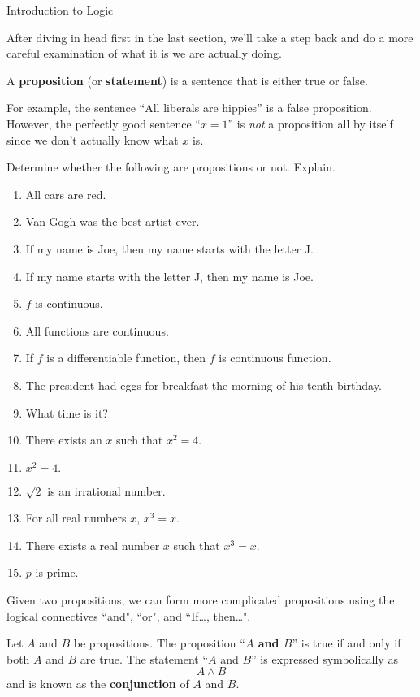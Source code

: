 \begin{section}{Introduction to Logic}

After diving in head first in the last section, we'll take a step back and do a more careful examination of what it is we are actually doing.

\begin{definition}
A \textbf{proposition} (or \textbf{statement}) is a sentence that is either true or false.
\end{definition}

For example, the sentence ``All liberals are hippies'' is a false proposition.  However, the perfectly good sentence ``$x=1$'' is \emph{not} a proposition all by itself since we don't actually know what $x$ is.

\begin{exercise} Determine whether the following are propositions or not. Explain.
\begin{enumerate}
\item All cars are red.
\item Van Gogh was the best artist ever. 
\item If my name is Joe, then my name starts with the letter J.
\item If my name starts with the letter J, then my name is Joe.
\item $f$ is continuous.
\item All functions are continuous.
\item If $f$ is a differentiable function, then $f$ is continuous function.
\item The president had eggs for breakfast the morning of his tenth birthday.
\item What time is it? 
\item There exists an $x$ such that $x^2=4$.
\item $x^2=4.$
\item $\sqrt{2}$ is an irrational number.
\item For all real numbers $x$, $x^3=x$.
\item There exists a real number $x$ such that $x^3=x$.
\item $p$ is prime.
\end{enumerate}
\end{exercise}

Given two propositions, we can form more complicated propositions using the logical connectives ``and", ``or", and ``If\ldots, then\ldots".

\begin{definition}
Let $A$ and $B$ be propositions.  The proposition ``\textbf{$A$ and $B$}'' is true if and only if both $A$ and $B$ are true.  The statement ``$A$ and $B$'' is expressed symbolically as 
\[
A \wedge B
\]
and is known as the \textbf{conjunction} of $A$ and $B$.
\end{definition}


\end{section}
